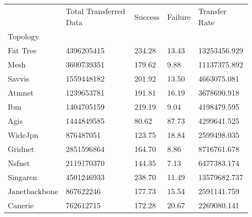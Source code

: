 \begin{tabular}{lllll}
 & Total Transferred Data & Success & Failure & Transfer Rate \\
Topology &  &  &  &  \\
Fat Tree & 4396205415 & 234.28 & 13.43 & 13253456.929 \\
Mesh & 3600739351 & 179.62 & 9.88 & 11137375.892 \\
Savvis & 1559448182 & 201.92 & 13.50 & 4663075.081 \\
Atmnet & 1239653781 & 191.81 & 16.19 & 3678690.918 \\
Ibm & 1404705159 & 219.19 & 9.04 & 4198479.595 \\
Agis & 1444849585 & 80.62 & 87.73 & 4299641.525 \\
WideJpn & 876487051 & 123.75 & 18.84 & 2599498.035 \\
Gridnet & 2851596864 & 164.70 & 8.86 & 8716761.678 \\
Nsfnet & 2119170370 & 144.35 & 7.13 & 6477383.174 \\
Singaren & 4501246933 & 238.70 & 11.49 & 13579682.737 \\
Janetbackbone & 867622246 & 177.73 & 15.54 & 2591141.759 \\
Canerie & 762612715 & 172.28 & 20.67 & 2269080.141 \\
\end{tabular}
